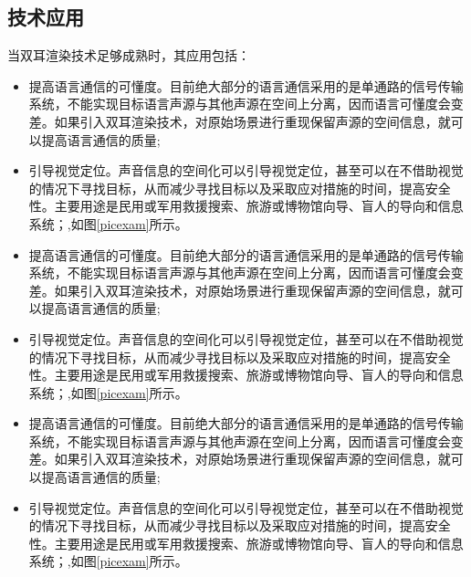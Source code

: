 \subsection{技术应用}
当双耳渲染技术足够成熟时，其应用包括：
\begin{itemize}[leftmargin=*]
\item 提高语言通信的可懂度。目前绝大部分的语言通信采用的是单通路的信号传输系统，不能实现目标语言声源与其他声源在空间上分离，因而语言可懂度会变差。如果引入双耳渲染技术，对原始场景进行重现保留声源的空间信息，就可以提高语言通信的质量;\cite{_fe-p_2020}
\item 引导视觉定位。声音信息的空间化可以引导视觉定位，甚至可以在不借助视觉的情况下寻找目标，从而减少寻找目标以及采取应对措施的时间，提高安全性。主要用途是民用或军用救援搜索、旅游或博物馆向导、盲人的导向和信息系统；\cite{liu_approaching_2018},如图\ref{picexam}所示。
\item 提高语言通信的可懂度。目前绝大部分的语言通信采用的是单通路的信号传输系统，不能实现目标语言声源与其他声源在空间上分离，因而语言可懂度会变差。如果引入双耳渲染技术，对原始场景进行重现保留声源的空间信息，就可以提高语言通信的质量;\cite{_fe-p_2020}
\item 引导视觉定位。声音信息的空间化可以引导视觉定位，甚至可以在不借助视觉的情况下寻找目标，从而减少寻找目标以及采取应对措施的时间，提高安全性。主要用途是民用或军用救援搜索、旅游或博物馆向导、盲人的导向和信息系统；\cite{liu_approaching_2018},如图\ref{picexam}所示。
\item 提高语言通信的可懂度。目前绝大部分的语言通信采用的是单通路的信号传输系统，不能实现目标语言声源与其他声源在空间上分离，因而语言可懂度会变差。如果引入双耳渲染技术，对原始场景进行重现保留声源的空间信息，就可以提高语言通信的质量;\cite{_fe-p_2020}
\item 引导视觉定位。声音信息的空间化可以引导视觉定位，甚至可以在不借助视觉的情况下寻找目标，从而减少寻找目标以及采取应对措施的时间，提高安全性。主要用途是民用或军用救援搜索、旅游或博物馆向导、盲人的导向和信息系统；\cite{liu_approaching_2018},如图\ref{picexam}所示。
\end{itemize}

